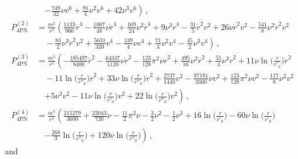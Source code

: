 \documentclass[prd,preprint,superscriptaddress,tightenlines,nofootinbib,
  eqsecnum,showpacs]{revtex4}
\begin{document}
\begin{subequations}
\begin{align}
\nonumber\\
&\quad \left.  -  \frac{749}{32} \nu v^{6} + \frac{91}{4} \nu^2 v^{6}
 + 42 \nu^3 v^{6}\right)
 \,,\\
P^{(2)}_\text{4PN} &= \frac{m^2}{r^2} \left(\frac{1133}{960} \dot{r}^4
 -  \frac{1007}{48} \nu \dot{r}^4
 + \frac{169}{24} \nu^2 \dot{r}^4
 + 9 \nu^3 \dot{r}^4
 -  \frac{31}{5} \dot{r}^2 v^{2}
 + 26 \nu \dot{r}^2 v^{2}
 -  \frac{541}{8} \nu^2 \dot{r}^2 v^{2}\right.\nonumber\\
&\left.\quad -  \frac{83}{2} \nu^3 \dot{r}^2 v^{2}
 + \frac{5631}{320} v^{4}
 -  \frac{139}{4} \nu v^{4}
 + \frac{71}{4} \nu^2 v^{4}
 -  \frac{45}{2} \nu^3 v^{4}\right)
 \,,\\
P^{(3)}_\text{4PN} &= \frac{m^3}{r^3} \left(- \frac{185497}{8400} \dot{r}^2
 -  \frac{64347}{1120} \nu \dot{r}^2
 -  \frac{123}{128} \pi^2 \nu \dot{r}^2
 + \frac{495}{16} \nu^2 \dot{r}^2
 + \frac{55}{4} \nu^3 \dot{r}^2
 + 11 \nu \ln\Big(\frac{r}{r'_{0}}\Big) \dot{r}^2\right.\nonumber\\
&\quad - 11 \ln\Big(\frac{r}{r''_{0}}\Big) \dot{r}^2
 + 33 \nu \ln\Big(\frac{r}{r''_{0}}\Big) \dot{r}^2
 + \frac{2737}{1440} v^{2}
 -  \frac{87181}{3360} \nu v^{2}
 + \frac{123}{128} \pi^2 \nu v^{2}
 -  \frac{117}{8} \nu^2 v^{2}\nonumber\\
&\quad\left. + 5 \nu^3 v^{2}
 - 11 \nu \ln\Big(\frac{r}{r'_{0}}\Big) v^{2}
 + 22 \ln\Big(\frac{r}{r''_{0}}\Big) v^{2}\right)
 \,,\\
P^{(4)}_\text{4PN} &= \frac{m^4}{r^4} \left(\frac{215279}{3600}
 + \frac{22043}{720} \nu
 -  \frac{11}{2} \pi^2 \nu
 -  \frac{3}{2} \nu^2
 -  \frac{1}{2} \nu^3
 + 16 \ln\Big(\frac{r}{r'_{0}}\Big)
 - 60 \nu \ln\Big(\frac{r}{r'_{0}}\Big)\right.\nonumber\\
&\quad\left. -  \frac{268}{3} \ln\Big(\frac{r}{r''_{0}}\Big)
 + 120 \nu \ln\Big(\frac{r}{r''_{0}}\Big)\right)
 \,,
\end{align}
\end{subequations}
%
and
%
\end{document}
